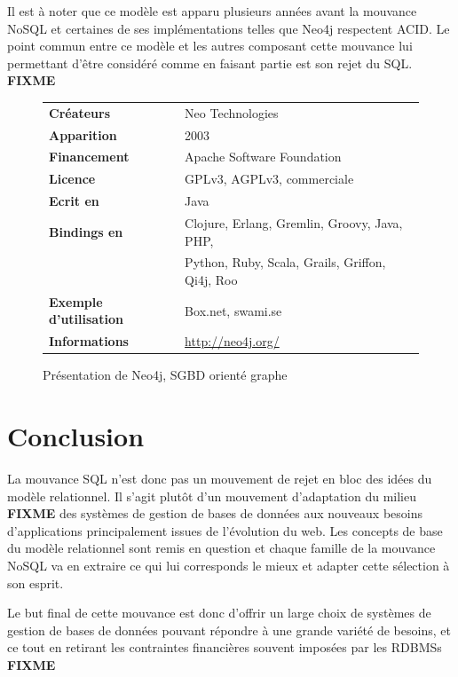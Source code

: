 \documentclass[11pt]{article}
\begin{document}
Il est à noter que ce modèle est apparu plusieurs années avant la mouvance NoSQL et certaines de ses implémentations telles que Neo4j respectent ACID. Le point commun entre ce modèle et les autres composant cette mouvance lui permettant d'être considéré comme en faisant partie est son rejet du SQL. \colorbox{BrickRed}{\textbf{FIXME}} 
\begin{figure}[H] \label{neo4j}
  \centering
  \begin{tabular}{l | l}
    \textbf{Créateurs} & Neo Technologies \\
    \textbf{Apparition} & 2003 \\
    \textbf{Financement} & Apache Software Foundation \\
    \textbf{Licence} & GPLv3, AGPLv3, commerciale \\
    \textbf{Ecrit en} & Java \\
    \textbf{Bindings en} & Clojure, Erlang, Gremlin, Groovy, Java, PHP,  \\
    & Python, Ruby, Scala, Grails, Griffon, Qi4j, Roo\\
    \textbf{Exemple d'utilisation} & Box.net, swami.se \\
    \textbf{Informations} & \url{http://neo4j.org/}
  \end{tabular}
  \caption{Présentation de Neo4j, SGBD orienté graphe}
\end{figure}
\section{Conclusion}
La mouvance SQL n'est donc pas un mouvement de rejet en bloc des idées du modèle relationnel. Il s'agit plutôt d'un mouvement d'adaptation du milieu \colorbox{BrickRed}{\textbf{FIXME}} des systèmes de gestion de bases de données aux nouveaux besoins d'applications principalement issues de l'évolution du web. Les concepts de base du modèle relationnel sont remis en question et chaque famille de la mouvance NoSQL va en extraire ce qui lui corresponds le mieux et adapter cette sélection à son esprit.

Le but final de cette mouvance est donc d'offrir un large choix de systèmes de gestion de bases de données pouvant répondre à une grande variété de besoins, et ce tout en retirant les contraintes financières souvent imposées par les RDBMSs \colorbox{BrickRed}{\textbf{FIXME}} 
\end{document}
